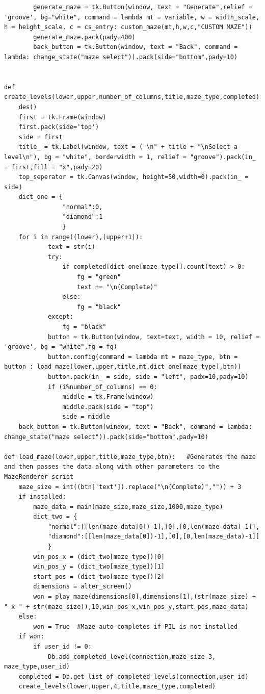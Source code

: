 \documentclass{article}
\begin{document}
\begin{lstlisting}
        generate_maze = tk.Button(window, text = "Generate",relief = 'groove', bg="white", command = lambda mt = variable, w = width_scale, h = height_scale, c = cs_entry: custom_maze(mt,h,w,c,"CUSTOM MAZE"))
        generate_maze.pack(pady=400)
        back_button = tk.Button(window, text = "Back", command = lambda: change_state("maze select")).pack(side="bottom",pady=10)


def create_levels(lower,upper,number_of_columns,title,maze_type,completed):
    des()
    first = tk.Frame(window)
    first.pack(side='top')
    side = first
    title_ = tk.Label(window, text = ("\n" + title + "\nSelect a level\n"), bg = "white", borderwidth = 1, relief = "groove").pack(in_ = first,fill = "x",pady=20)
    top_seperator = tk.Canvas(window, height=50,width=0).pack(in_ = side)
    dict_one = {
                "normal":0,
                "diamond":1
                }
    for i in range((lower),(upper+1)):
            text = str(i)                          
            try:
                if completed[dict_one[maze_type]].count(text) > 0:
                    fg = "green"
                    text += "\n(Complete)"
                else:
                    fg = "black"
            except:
                fg = "black"
            button = tk.Button(window, text=text, width = 10, relief = 'groove', bg = "white",fg = fg)
            button.config(command = lambda mt = maze_type, btn = button : load_maze(lower,upper,title,mt,dict_one[maze_type],btn))
            button.pack(in_ = side, side = "left", padx=10,pady=10)
            if (i%number_of_columns) == 0:
                middle = tk.Frame(window)
                middle.pack(side = "top")
                side = middle
    back_button = tk.Button(window, text = "Back", command = lambda: change_state("maze select")).pack(side="bottom",pady=10)

def load_maze(lower,upper,title,maze_type,btn):   #Generates the maze and then passes the data along with other parameters to the MazeRenderer script
    maze_size = int((btn['text']).replace("\n(Complete)","")) + 3
    if installed:        
        maze_data = main(maze_size,maze_size,1000,maze_type)
        dict_two = {
            "normal":[[len(maze_data[0])-1],[0],[0,len(maze_data)-1]],
            "diamond":[[len(maze_data[0])-1],[0],[0,len(maze_data)-1]]
            }
        win_pos_x = (dict_two[maze_type])[0]
        win_pos_y = (dict_two[maze_type])[1]
        start_pos = (dict_two[maze_type])[2]
        dimensions = alter_screen()
        won = play_maze(dimensions[0],dimensions[1],(str(maze_size) + " x " + str(maze_size)),10,win_pos_x,win_pos_y,start_pos,maze_data)
    else:
        won = True  #Maze auto-completes if PIL is not installed
    if won:
        if user_id != 0:
            Db.add_completed_level(connection,maze_size-3, maze_type,user_id)
    completed = Db.get_list_of_completed_levels(connection,user_id)
    create_levels(lower,upper,4,title,maze_type,completed)


\end{lstlisting}
\end{document}
